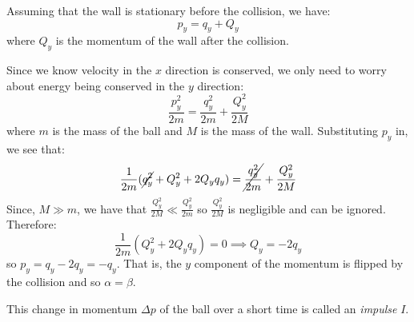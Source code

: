 \documentclass[../main.tex]{subfiles}
\begin{document}
Assuming that the wall is stationary before the collision, we have:
\[
  p_y = q_y + Q_y
\]
where $Q_y$ is the momentum of the wall after the collision.

Since we know velocity in the $x$ direction is conserved, we only need to worry about energy being conserved in the $y$ direction:
\[
  \frac{p^2_y}{2m} = \frac{q^2_y}{2m} + \frac{Q^2_y}{2M}
\]
where $m$ is the mass of the ball and $M$ is the mass of the wall.
Substituting $p_y$ in, we see that:
\[
  \frac{1}{2m}(\cancel{q^2_y} + Q^2_y + 2Q_y q_y) = \cancel{\frac{q^2_y}{2m}} + \frac{Q^2_y}{2M}
\]
Since, $M \gg m$, we have that $\frac{Q^2_y}{2M} \ll \frac{Q^2_y}{2m}$ so $\frac{Q^2_y}{2M}$ is negligible and can be ignored.
Therefore:
\[
  \frac{1}{2m}(Q^2_y + 2Q_yq_y) = 0 \implies Q_y = -2q_y
\]
so $p_y = q_y - 2q_y = -q_y$.
That is, the $y$ component of the momentum is flipped by the collision and so $\alpha = \beta$.

This change in momentum $\Delta p$ of the ball over a short time is called an \textit{impulse} $I$.
\end{document}
